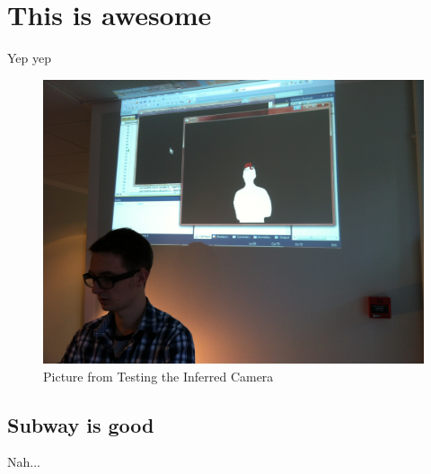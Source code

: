      


\section{This is awesome}
Yep yep

\begin{figure}[htbp]
\centering
\includegraphics[width=1.00\textwidth]{Pictures/Test/IMG_1477.jpg}
\caption{Picture from Testing the Inferred Camera}
\label{fig:Picture from Testing the Inferred Camera}
\end{figure}

\subsection{Subway is good}
Nah...